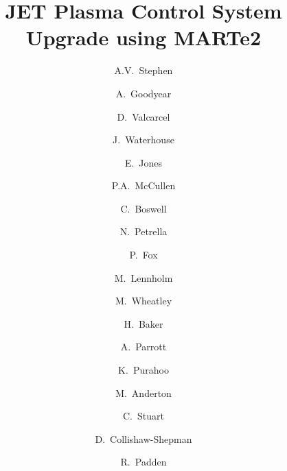 \documentclass[preprint]{elsarticle}
\begin{document}
\begin{frontmatter}



\title{JET Plasma Control System Upgrade using MARTe2}


	\author[UKAEA]{A.V.~Stephen} %
\author[UKAEA]{A.~Goodyear}
\author[UKAEA]{D.~Valcarcel}
\author[UKAEA]{J.~Waterhouse}
\author[UKAEA]{E.~Jones}
\author[UKAEA]{P.A.~McCullen}
\author[UKAEA]{C.~Boswell}
\author[UKAEA]{N.~Petrella}
\author[UKAEA]{P.~Fox}
\author[UKAEA]{M.~Lennholm}
\author[UKAEA]{M.~Wheatley}
\author[UKAEA]{H.~Baker}
\author[UKAEA]{A.~Parrott}
\author[UKAEA]{K.~Purahoo}
\author[UKAEA]{M.~Anderton}
\author[UKAEA]{C.~Stuart}
\author[UKAEA]{D.~Collishaw-Shepman}
\author[UKAEA]{R.~Padden}



\end{frontmatter}
\end{document}
